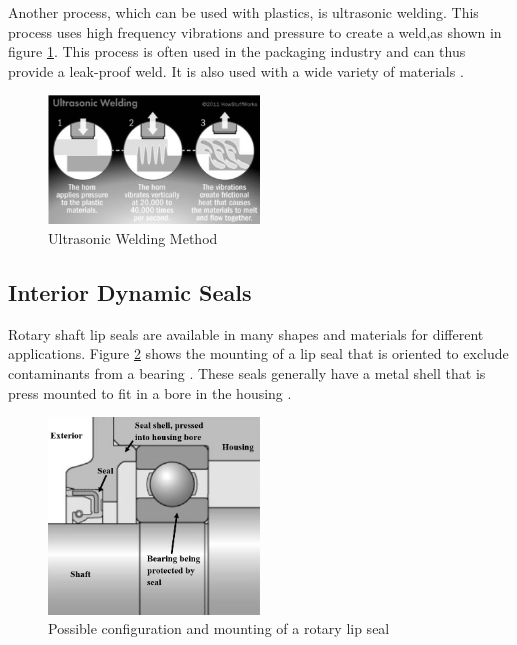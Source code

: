 Another process, which can be used with plastics, is ultrasonic welding. This process uses high frequency vibrations and pressure to create a weld,as shown in figure \ref{fig:welding_USW}. This process is often used in the packaging industry and can thus provide a leak-proof weld. It is also used with a wide variety of materials \cite{weman_welding_2012} \cite{telsonic_plastic_nodate}.

\begin{figure}[H]
    \centering
    \includegraphics[width=0.5\textwidth]{Sections/LiteratureReview/img/seals/welding_USW.JPG}
    \caption{Ultrasonic Welding Method \cite{freudenrich_how_2011}}
    \label{fig:welding_USW}
\end{figure}


\subsection{Interior Dynamic Seals} \label{app:dynamicseals}

Rotary shaft lip seals are available in many shapes and materials for different applications. Figure \ref{fig:seal_rotary2} shows the mounting of a lip seal that is oriented to exclude contaminants from a bearing \cite{skf_external_nodate}. These seals generally have a metal shell that is press mounted to fit in a bore in the housing \cite{skf_seal_nodate}. 

\begin{figure}[H]
    \centering
    \includegraphics[width=0.5\textwidth]{Sections/LiteratureReview/img/seals/seal_rotary2.JPG}
    \caption{Possible configuration and mounting of a rotary lip seal \cite{skf_external_nodate}}
    \label{fig:seal_rotary2}
\end{figure}

